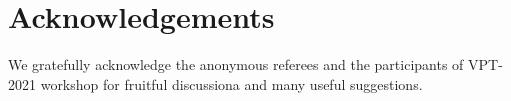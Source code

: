 \section*{Acknowledgements}
We gratefully acknowledge the anonymous referees and the participants of
VPT-2021 workshop for fruitful discussiona and many useful suggestions.